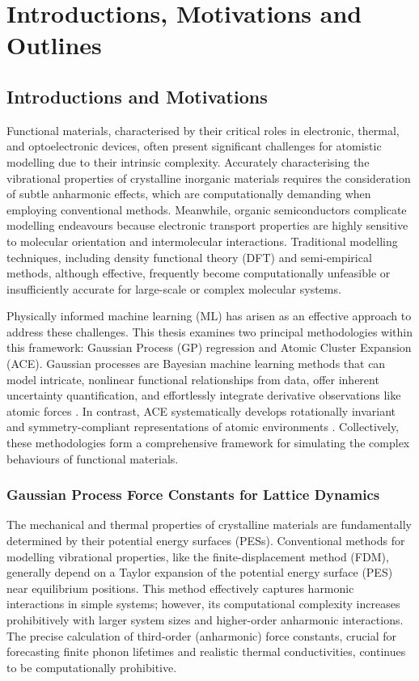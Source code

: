 \chapter{Introductions, Motivations and Outlines}
\label{ch:1}


\section{Introductions and Motivations}
\label{sec:1.1}

Functional materials, characterised by their critical roles in electronic, thermal, and optoelectronic devices, often present significant challenges for atomistic modelling due to their intrinsic complexity. Accurately characterising the vibrational properties of crystalline inorganic materials requires the consideration of subtle anharmonic effects, which are computationally demanding when employing conventional methods. Meanwhile, organic semiconductors complicate modelling endeavours because electronic transport properties are highly sensitive to molecular orientation and intermolecular interactions. Traditional modelling techniques, including density functional theory (DFT) and semi-empirical methods, although effective, frequently become computationally unfeasible or insufficiently accurate for large-scale or complex molecular systems.

Physically informed machine learning (ML) has arisen as an effective approach to address these challenges. This thesis examines two principal methodologies within this framework: Gaussian Process (GP) regression and Atomic Cluster Expansion (ACE).  Gaussian processes are Bayesian machine learning methods that can model intricate, nonlinear functional relationships from data, offer inherent uncertainty quantification, and effortlessly integrate derivative observations like atomic forces \cite{RasmussenW06, Bartk2015, Bartk2017}.  In contrast, ACE systematically develops rotationally invariant and symmetry-compliant representations of atomic environments \cite{Drautz2019, Dusson2022}.  Collectively, these methodologies form a comprehensive framework for simulating the complex behaviours of functional materials.

\subsection{Gaussian Process Force Constants for Lattice Dynamics}

The mechanical and thermal properties of crystalline materials are fundamentally determined by their potential energy surfaces (PESs).  Conventional methods for modelling vibrational properties, like the finite-displacement method (FDM), generally depend on a Taylor expansion of the potential energy surface (PES) near equilibrium positions.  This method effectively captures harmonic interactions in simple systems; however, its computational complexity increases prohibitively with larger system sizes and higher-order anharmonic interactions.  The precise calculation of third-order (anharmonic) force constants, crucial for forecasting finite phonon lifetimes and realistic thermal conductivities, continues to be computationally prohibitive.

